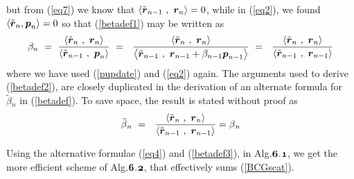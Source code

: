but from (\ref{eq7}) we know that $\left\langle{ \tilde{\bmi  r}{}_{n-1}\ 
,\ {\bmi   r}_{ n} }\right\rangle=0$, while in (\ref{eq2}), we found
$\left\langle{{\tilde{ \mbox{\boldmath$\mit r$\unboldmath}}}_{ n} ,{\mbox{\boldmath$\mit p$\unboldmath}}_{n}}\right\rangle=0$ 
so that  (\ref{betadef1}) may be written as
\begin{equation} \label{betadef2}
{ \beta }_{n} \ =  \ {\frac{\left\langle{{\tilde{ \mbox{\boldmath$\mit r$\unboldmath}}}_{n}\ ,
\  {\mbox{\boldmath$\mit r$\unboldmath}}_{ n}}\right\rangle}
{\left\langle{{\tilde{ \mbox{\boldmath$\mit r$\unboldmath}}}_{n-1}\ ,\  
{\mbox{\boldmath$\mit p$\unboldmath}}_{ n}}\right\rangle}}
\ = \
\ {\frac{\left\langle{{\tilde{ \mbox{\boldmath$\mit r$\unboldmath}}}_{n}\ ,
\  {\mbox{\boldmath$\mit r$\unboldmath}}_{ n}}\right\rangle}
{\left\langle{{\tilde{ \mbox{\boldmath$\mit r$\unboldmath}}}_{n-1}\ ,\  
{\mbox{\boldmath$\mit r$\unboldmath}}_{ n-1} + {\beta}_{n-1} {\mbox{\boldmath$\mit p$\unboldmath}}_{ n-1}}\right\rangle}}
\ = \
\ {\frac{\left\langle{{\tilde{ \mbox{\boldmath$\mit r$\unboldmath}}}_{n}\ ,
\  {\mbox{\boldmath$\mit r$\unboldmath}}_{ n}}\right\rangle}
{\left\langle{{\tilde{ \mbox{\boldmath$\mit r$\unboldmath}}}_{n-1}\ ,\  
{\mbox{\boldmath$\mit r$\unboldmath}}_{ n-1}}\right\rangle}}
\end{equation}
where we have used (\ref{pupdate}) and (\ref{eq2}) again.
The arguments used to derive  (\ref{betadef2}), are closely duplicated in 
the derivation of an alternate formula for $\tilde{\beta}{}_{n}$ in 
(\ref{betadef}). To save space, the result is stated without 
proof as 
\begin{equation} \label{betadef3}
\tilde{ \beta }{}_{n} \ =  \
\ {\frac{\left\langle{{\tilde{ \mbox{\boldmath$\mit r$\unboldmath}}}_{n}\ ,
\  {\mbox{\boldmath$\mit r$\unboldmath}}_{ n}}\right\rangle}
{\left\langle{{\tilde{ \mbox{\boldmath$\mit r$\unboldmath}}}_{n-1}\ ,\  
{\mbox{\boldmath$\mit r$\unboldmath}}_{ n-1}}\right\rangle}} = { \beta }{}_{n}
\end{equation}

Using the alternative formulae (\ref{eq4}) and (\ref{betadef3}), in 
Alg.${\mbox{\boldmath$\mit 6$\unboldmath}}$.${\mbox{\boldmath$\mit 1$\unboldmath}}$,
we get the more efficient scheme of Alg.${\mbox{\boldmath$\mit 6$\unboldmath}}$.${\mbox{\boldmath$\mit 2$\unboldmath}}$, that 
effectively 
sums (\ref{BCGscat}).

 


